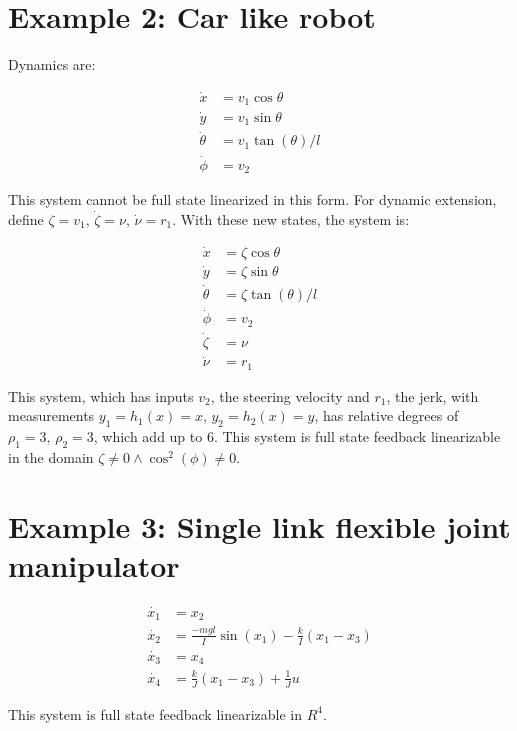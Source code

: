 \documentclass{article}[14pt]
\begin{document}
\section{Example 2: Car like robot}

Dynamics are:

\begin{subequations}
\begin{align}
\dot{x} &=v_1\cos{\theta} \\
\dot{y} &=v_1\sin{\theta} \\
\dot{\theta}&=v_1\tan(\theta)/l \\
\dot{\phi}&=v_2
\end{align}
\end{subequations}

This system cannot be full state linearized in this form. For dynamic extension, define $\zeta=v_1,\,\dot{\zeta}=\nu,\,\dot{\nu}=r_1$. With these new states, the system is:

\begin{subequations}
\begin{align}
\dot{x} &=\zeta\cos{\theta} \\
\dot{y} &=\zeta\sin{\theta} \\
\dot{\theta}&=\zeta\tan(\theta)/l \\
\dot{\phi}&=v_2 \\
\dot{\zeta}&=\nu \\
\dot{\nu}&=r_1
\end{align}
\end{subequations}

This system, which has inputs $v_2$, the steering velocity and $r_1$, the jerk, with measurements $y_1 = h_1(x) = x,\,y_2=h_2(x)=y$, has relative degrees of $\rho_1=3,\,\rho_2=3$, which add up to $6$. This system is full state feedback linearizable in the domain $\zeta\neq 0 \wedge \cos^2(\phi)\neq0$.

\section{Example 3: Single link flexible joint manipulator}

\begin{subequations}
\begin{align}
\dot{x_1}&=x_2 \\
\dot{x_2}&=\frac{-mgl}{I}\sin(x_1)-\frac{k}{I}(x_1-x_3) \\
\dot{x_3}&=x_4 \\
\dot{x_4}&=\frac{k}{J}(x_1-x_3)+\frac{1}{J}u
\end{align}
\end{subequations}

This system is full state feedback linearizable in $R^4$.
\end{document}
